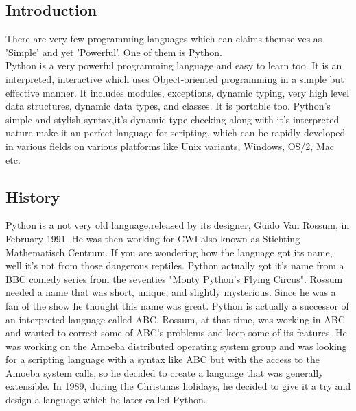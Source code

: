 
\subsection{Introduction}
There are very few programming languages which can claims themselves as 'Simple' and yet 'Powerful'. One of them is Python.
\\
Python is a very powerful programming language and easy to learn too. It is an interpreted, interactive which uses Object-oriented programming in a simple but effective manner. It includes modules, exceptions, dynamic typing, very high level data structures, dynamic data types, and classes.  It is portable too. Python's simple and stylish syntax,it's dynamic type checking along with it's interpreted nature make it an perfect language for scripting, which can be rapidly developed in various fields on various platforms like Unix variants, Windows, OS/2, Mac etc.
\subsection{History}
Python is a not very old language,released by its designer, Guido Van Rossum, in February 1991. He was then  working for CWI also known as Stichting Mathematisch Centrum. If you are wondering how the language got its name, well it's not from those dangerous reptiles. Python actually got it's name from a BBC comedy series from the seventies "Monty Python's Flying Circus". Rossum needed a name that was short, unique, and slightly mysterious. Since he was a fan of the show he thought this name was great.
Python is actually a successor of an interpreted language called ABC. Rossum, at that time,  was working in ABC and wanted to correct some of ABC's problems and keep some of its features. He was working on the Amoeba distributed operating system group and was looking for a scripting language with a syntax like ABC but with the access to the Amoeba system calls, so he decided to create a language that was generally extensible. In 1989, during the Christmas holidays, he decided to give it a try and design a language which he later called Python.

